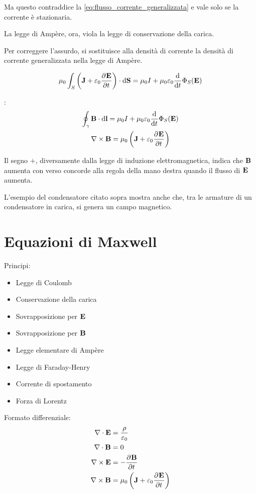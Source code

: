 Ma questo contraddice la \eqref{eq:flusso_corrente_generalizzata} e vale solo se la corrente è stazionaria.

La legge di Ampère, ora, viola la legge di conservazione della carica.

Per correggere l'assurdo, si sostituisce alla densità di corrente la densità di corrente generalizzata nella legge di Ampère.

\begin{equation}
    \mu_0 \int_S \pts{\dcurr + \eps_0 \parder[\E]{t}} \sde
    = \mu_0 I + \mu_0\eps_0 \der{t} \Phi_S(\E)
\end{equation}

:
\begin{subequations}
\begin{gather}
    \oint_\gamma \B \lde
    = \mu_0 I + \mu_0\eps_0 \der{t} \Phi_S(\E) \\
    \curl \B = \mu_0 \pts{\dcurr + \eps_0 \parder[\E]{t}}
\end{gather}
\end{subequations}

Il segno $+$, diversamente dalla legge di induzione elettromagnetica, indica che $\mathbf{B}$ aumenta con verso concorde alla regola della mano destra quando il flusso di $\mathbf{E}$ aumenta.

L'esempio del condensatore citato sopra mostra anche che, tra le armature di un condensatore in carica, si genera un campo magnetico.

\section{Equazioni di Maxwell}

Principi:
\begin{itemize}
    \item Legge di Coulomb
    \item Conservazione della carica
    \item Sovrapposizione per $\mathbf{E}$
    \item Sovrapposizione per $\mathbf{B}$
    \item Legge elementare di Ampère
    \item Legge di Faraday-Henry
    \item Corrente di spostamento
    \item Forza di Lorentz
\end{itemize}
\medskip

Formato differenziale:
\begin{align}
    \diver \E & = \frac{\rho}{\eps_0} \\
    \diver \B & = 0 \\
    \curl \E & = - \parder[\B]{t} \\
    \curl \B & = \mu_0 \pts{\dcurr + \eps_0 \parder[\E]{t}}
\end{align}

